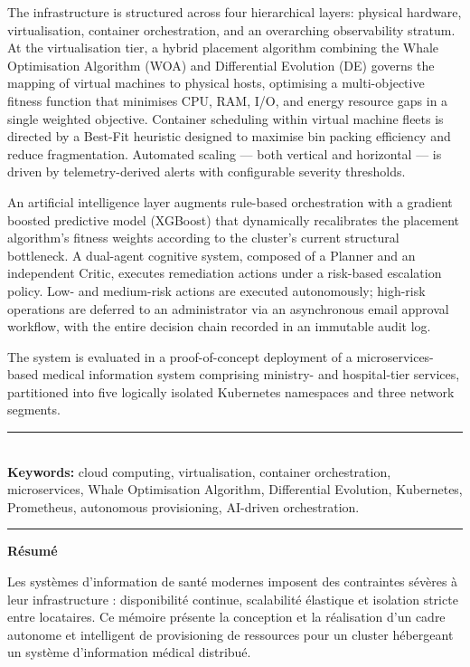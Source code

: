 \documentclass[12pt,a4paper]{report}
\begin{document}
The infrastructure is structured across four hierarchical layers: physical hardware,
virtualisation, container orchestration, and an overarching observability stratum. At
the virtualisation tier, a hybrid placement algorithm combining the Whale Optimisation
Algorithm (WOA) and Differential Evolution (DE) governs the mapping of virtual machines
to physical hosts, optimising a multi-objective fitness function that minimises CPU,
RAM, I/O, and energy resource gaps in a single weighted objective. Container scheduling within virtual
machine fleets is directed by a Best-Fit heuristic designed to maximise bin packing
efficiency and reduce fragmentation. Automated scaling --- both vertical and horizontal
--- is driven by telemetry-derived alerts with configurable severity thresholds.

An artificial intelligence layer augments rule-based orchestration with a gradient
boosted predictive model (XGBoost) that dynamically recalibrates the placement
algorithm's fitness weights according to the cluster's current structural bottleneck.
A dual-agent cognitive system, composed of a Planner and an independent Critic,
executes remediation actions under a risk-based escalation policy. Low- and
medium-risk actions are executed autonomously; high-risk operations are deferred to
an administrator via an asynchronous email approval workflow, with the entire decision
chain recorded in an immutable audit log.

The system is evaluated in a proof-of-concept deployment of a microservices-based
medical information system comprising ministry- and hospital-tier services, partitioned
into five logically isolated Kubernetes namespaces and three network segments.

\vspace{1.2cm}
\noindent\rule{\textwidth}{0.4pt}\\[4pt]
\noindent\textbf{Keywords:} cloud computing, virtualisation, container orchestration,
microservices, Whale Optimisation Algorithm, Differential Evolution, Kubernetes,
Prometheus, autonomous provisioning, AI-driven orchestration.\\[4pt]
\noindent\rule{\textwidth}{0.4pt}

\vspace{1.5cm}

\noindent\textbf{Résumé}

\vspace{0.3cm}

Les systèmes d'information de santé modernes imposent des contraintes sévères à leur
infrastructure : disponibilité continue, scalabilité élastique et isolation stricte
entre locataires. Ce mémoire présente la conception et la réalisation d'un cadre
autonome et intelligent de provisioning de ressources pour un cluster hébergeant un
système d'information médical distribué.
\end{document}
